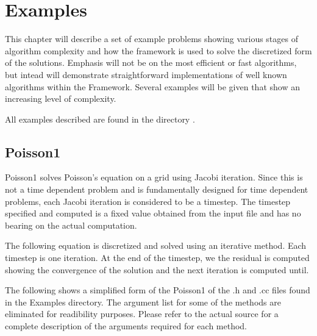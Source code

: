 \chapter{Examples}

This chapter will describe a set of example problems showing various
stages of algorithm complexity and how the \Vaango framework is used to
solve the discretized form of the solutions.  Emphasis will not be on
the most efficient or fast algorithms, but intead will demonstrate
straightforward implementations of well known algorithms within the
\Vaango Framework.  Several examples will be given that show an
increasing level of complexity.

All examples described are found in the directory
.

\section{Poisson1}

Poisson1 solves Poisson's equation on a grid using Jacobi
iteration.  Since this is not a time dependent problem and \Vaango is
fundamentally designed for time dependent problems, each Jacobi
iteration is considered to be a timestep.  The timestep specified and
computed is a fixed value obtained from the input file and has no
bearing on the actual computation.

The following equation is discretized and solved using an iterative
method. Each timestep is one iteration. At the end of the timestep, we
the residual is computed showing the convergence of the solution and
the next iteration is computed until.

The following shows a simplified form of the Poisson1 of the .h and
.cc files found in the Examples directory.  The argument list for some
of the methods are eliminated for readibility purposes.  Please refer
to the actual source for a complete description of the arguments
required for each method.


